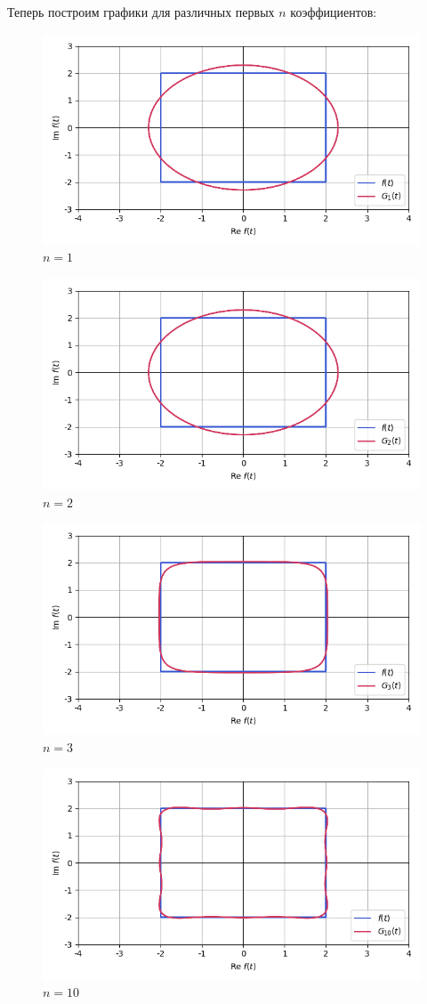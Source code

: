 \documentclass[a4paper]{article}
\begin{document}
Теперь построим графики для различных первых $n$ коэффициентов:
\begin{figure}[H]
    \centering
    \includegraphics[width=0.8\linewidth]{param/1.png}
    \caption{$n = 1$}
\end{figure}
\begin{figure}[H]
    \centering
    \includegraphics[width=0.8\linewidth]{param/2.png}
    \caption{$n = 2$}
\end{figure}
\begin{figure}[H]
    \centering
    \includegraphics[width=0.8\linewidth]{param/3.png}
    \caption{$n = 3$}
\end{figure}
\begin{figure}[H]
    \centering
    \includegraphics[width=0.8\linewidth]{param/10.png}
    \caption{$n = 10$}
\end{figure}
\end{document}
